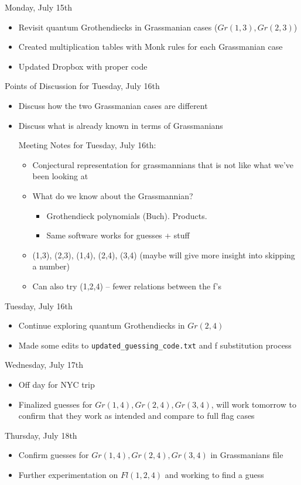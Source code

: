 Monday, July 15th
\begin{itemize}
    \item Revisit quantum Grothendiecks in Grassmanian cases ($Gr(1, 3), Gr(2, 3)$)
    \item Created multiplication tables with Monk rules for each Grassmanian case
    \item Updated Dropbox with proper code
\end{itemize}

Points of Discussion for Tuesday, July 16th
\begin{itemize}
    \item Discuss how the two Grassmanian cases are different
    \item Discuss what is already known in terms of Grassmanians

Meeting Notes for Tuesday, July 16th:
\begin{itemize}
    \item Conjectural representation for grassmannians that is not like what we've been looking at
    \item What do we know about the Grassmannian?
    \begin{itemize}
        \item Grothendieck polynomials (Buch). Products. 
        \item Same software works for guesses + stuff
    \end{itemize}
    \item (1,3), (2,3), (1,4), (2,4), (3,4) (maybe will give more insight into skipping a number)
    \item Can also try (1,2,4) -- fewer relations between the f's
\end{itemize}
\end{itemize}

Tuesday, July 16th
\begin{itemize}
    \item Continue exploring quantum Grothendiecks in $Gr(2, 4)$
    \item Made some edits to \texttt{updated\_guessing\_code.txt} and f substitution process
\end{itemize}

Wednesday, July 17th
\begin{itemize}
    \item Off day for NYC trip
    \item Finalized guesses for $Gr(1, 4), Gr(2, 4), Gr(3, 4)$, will work tomorrow to confirm that they work as intended and compare to full flag cases
\end{itemize}

Thursday, July 18th
\begin{itemize}
    \item Confirm guesses for $Gr(1, 4), Gr(2, 4), Gr(3, 4)$ in Grassmanians file
    \item Further experimentation on $Fl(1, 2, 4)$ and working to find a guess
\end{itemize}
